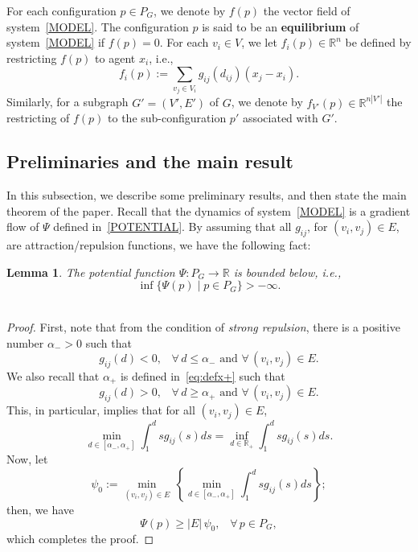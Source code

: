 \documentclass[10pt,twocolumn,twoside]{IEEEtran}
\newtheorem{lem}{Lemma}
\newcommand{\R}{\mathbb{R}}
\renewcommand{\(}{\left (}
\renewcommand{\)}{\right )}
\renewcommand{\;}{\,;\,}
\begin{document}
For each configuration $p\in P_G$, we denote by $f(p)$ the vector field of system~\eqref{MODEL}. The configuration $p$ is said to be an {\bf equilibrium} of system~\eqref{MODEL} if $f(p) = 0$.  For each $v_i\in V$, we let $f_i(p)\in \R^n$ be defined by restricting $f(p)$ to agent $x_i$, i.e., 
$$
f_i(p):= \sum_{v_j \in V_i} g_{ij}(d_{ij}) ( x_j- x_i).
$$
Similarly, for a subgraph $G' = (V', E')$ of $G$, we denote by $f_{V'}(p)\in \R^{n|V'|}$ the restricting of $f(p)$ to the sub-configuration $p'$ associated with $G'$.  
\subsection{Preliminaries and the main result}

In this subsection, we describe some preliminary results, and then state the main theorem of the paper.  
Recall that the dynamics of system~\eqref{MODEL} is a gradient flow of $\Psi$ defined in~\eqref{POTENTIAL}.    
By assuming that all $g_{ij}$, for $(v_i,v_j) \in E$, are attraction/repulsion functions,  we have the following fact: 


\begin{lem}\label{lem:phiboundedbelow}
The potential function $\Psi: P_G \to \mathbb{R}$ is bounded below, i.e., 
$$
\inf\{\Psi(p) \mid p\in P_G\} > -\infty.
$$ \, 
\end{lem}

\begin{proof}
First, note that from the condition of {\it strong repulsion}, there is a positive number $\alpha_-> 0$ such that $$
g_{ij}(d) < 0, \hspace{10pt} \forall \, d \le \alpha_- \mbox{ and } \forall\, (v_i,v_j)\in E.  
$$
We also recall that $\alpha_+$ is defined in~\eqref{eq:defx+} such that 
$$
g_{ij}(d) > 0, \hspace{10pt} \forall \, d \ge \alpha_+ \mbox{ and } \forall\, (v_i,v_j)\in E.  
$$
This, in particular, implies that for all $(v_i,v_j) \in E$, 
$$
\min_{d\in [\alpha_-, \alpha_+]} \int^d_{1} sg_{ij}(s) ds = \inf_{d \in \R_+} \int^d_{1} sg_{ij}(s)ds. 
$$
Now, let
\begin{equation}\label{eq:defpsi0}
\psi_0:= \min_{(v_i,v_j) \in E}\,\left\{ \min_{d\in [\alpha_-, \alpha_+]} \int^d_{1} s g_{ij}(s) ds \right\}; 
\end{equation}
then, we have
$$
\Psi(p) \ge |E|\, \psi_0, \hspace{10pt} \forall\, p\in P_G,
$$
which completes the proof.
\end{proof}
\end{document}
